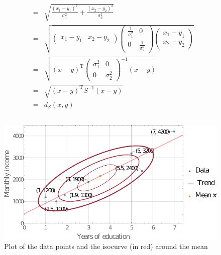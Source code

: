 \documentclass[DIN, pagenumber=false, fontsize=11pt, parskip=half]{scrartcl}
\begin{document}
\begin{enumerate}[label=\alph*)]
\begin{eqnarray*}
                    &=& \sqrt{\frac{{(x_1 - y_1)}^2}{\sigma_1^2} + \frac{{(x_2 - y_2)}^2}{\sigma_2^2}} \\
                    &=& \sqrt{
                        \begin{pmatrix}x_1 - y_1 & x_2 - y_2 \end{pmatrix} 
                            \begin{pmatrix} \frac{1}{\sigma_1^2} & 0 \\ 0 & \frac{1}{\sigma_2^2} \end{pmatrix} 
                            \begin{pmatrix}x_1 - y_1 \\ x_2 - y_2 \end{pmatrix}}\\
                    &=& \sqrt{{(x-y)}^\text{T}
                            {\begin{pmatrix} \sigma_1^2 & 0 \\ 0 & \sigma_2^2 \end{pmatrix}}^{-1}
                            (x-y)} \\
                    &=& \sqrt{{(x-y)}^\text{T}
                            S^{-1}
                            (x-y)} \\
                    &=& d_S(x,y)
            \end{eqnarray*}
    \end{enumerate}

    \subsection{}
    \begin{figure}[H]
        \centering
        \includegraphics[width=\textwidth]{A3_1.pdf}
        \caption{Plot of the data points and the isocurve (in red) around the mean}
    \end{figure}
\end{document}
